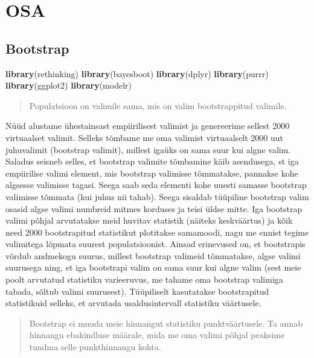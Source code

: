 \documentclass[]{book}
\newenvironment{Shaded}{\begin{snugshade}}{\end{snugshade}}
\newcommand{\KeywordTok}[1]{\textcolor[rgb]{0.13,0.29,0.53}{\textbf{#1}}}
\newcommand{\NormalTok}[1]{#1}
\begin{document}
\part{OSA}\label{part-osa-1}

\chapter{Bootstrap}\label{bootstrap}

\begin{Shaded}
\begin{Highlighting}[]
\KeywordTok{library}\NormalTok{(rethinking)}
\KeywordTok{library}\NormalTok{(bayesboot)}
\KeywordTok{library}\NormalTok{(dplyr)}
\KeywordTok{library}\NormalTok{(purrr)}
\KeywordTok{library}\NormalTok{(ggplot2)}
\KeywordTok{library}\NormalTok{(modelr)}
\end{Highlighting}
\end{Shaded}

\begin{quote}
Populatsioon on valimile sama, mis on valim bootstrappitud valimile.
\end{quote}

Nüüd alustame ühestainsast empiirilisest valimist ja genereerime sellest
2000 virtuaalset valimit. Selleks tõmbame me oma valimist virtuaalselt
2000 uut juhuvalimit (bootstrap valimit), millest igaüks on sama suur
kui algne valim. Saladus seisneb selles, et bootstrap valimite tõmbamine
käib asendusega, st iga empiirilise valimi element, mis bootstrap
valimisse tõmmatakse, pannakse kohe algsesse valimisse tagasi. Seega
saab seda elementi kohe uuesti samasse bootstrap valimisse tõmmata (kui
juhus nii tahab). Seega sisaldab tüüpiline bootstrap valim osasid algse
valimi numbreid mitmes korduses ja teisi üldse mitte. Iga bootstrap
valimi põhjal arvutatakse meid huvitav statistik (näiteks keskväärtus)
ja kõik need 2000 bootstrapitud statistikut plotitakse samamoodi, nagu
me ennist tegime valimitega lõpmata suurest populatsioonist. Ainsad
erinevused on, et bootstrapis võrdub andmekogu suurus, millest bootstrap
valimeid tõmmatakse, algse valimi suurusega ning, et iga bootstrapi
valim on sama suur kui algne valim (sest meie poolt arvutatud statistiku
varieeruvus, me tahame oma bootstrap valimiga tabada, sõltub valimi
suurusest). Tüüpiliselt kasutatakse bootstrapitud statistikuid selleks,
et arvutada usaldusintervall statistiku väärtusele.

\begin{quote}
Bootstrap ei muuda meie hinnangut statistiku punktväärtusele. Ta annab
hinnangu ebakindluse määrale, mida me oma valimi põhjal peaksime tundma
selle punkthinnangu kohta.
\end{quote}
\end{document}
